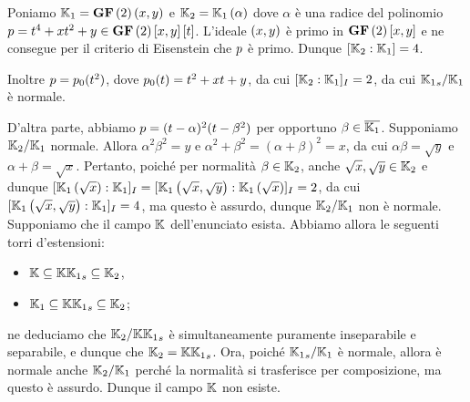 \Solution Poniamo $\mathbb{K}_1 = \textbf{GF} \left ( 2 \right ) \left ( x,y \right )$ e $\mathbb{K}_2 = \mathbb{K}_1 \left ( \alpha \right )$ dove $\alpha$ \`e una radice del polinomio $p = t^4 + xt^2 + y \in \textbf{GF} \left ( 2 \right ) \left [ x,y \right ] \left [ t \right ]$. L'ideale $\left ( x,y \right )$ \`e primo in $\textbf{GF} \left ( 2 \right ) \left [ x,y \right ]$ e ne consegue per il criterio di Eisenstein che $p$ \`e primo. Dunque $[\mathbb{K}_2:\mathbb{K}_1] = 4$.
\par Inoltre $p = p_0(t^2)$, dove $p_0(t) = t^2 + xt + y$, da cui $[\mathbb{K}_2:\mathbb{K}_1]_I = 2$, da cui $\FieldExtension{\SeparableClosure{\Field_1}}{\Field_1}$ \`e normale.
\par D'altra parte, abbiamo $p = (t - \alpha)^2(t - \beta^2)$ per opportuno $\beta \in \overline{\mathbb{K}_1}$. Supponiamo $\mathbb{K}_2/\mathbb{K}_1$ normale. Allora $\alpha^2\beta^2 = y$ e $\alpha^2 + \beta^2 = (\alpha + \beta)^2 = x$, da cui $\alpha\beta = \sqrt{y}$ e $\alpha + \beta = \sqrt{x}$. Pertanto, poich\'e per normalit\`a $\beta \in \mathbb{K}_2$, anche $\sqrt{x}, \sqrt{y} \in \mathbb{K}_2$ e dunque $[\mathbb{K}_1 \left ( \sqrt{x} \right ):\mathbb{K}_1]_I = [\mathbb{K}_1 \left ( \sqrt{x},\sqrt{y} \right ):\mathbb{K}_1 \left ( \sqrt{x} \right )]_I = 2$, da cui $[\mathbb{K}_1 \left ( \sqrt{x},\sqrt{y} \right ):\mathbb{K}_1]_I = 4$, ma questo \`e assurdo, dunque $\mathbb{K}_2/\mathbb{K}_1$ non \`e normale. \EndProof
\\\Solution Supponiamo che il campo $\mathbb{K}$ dell'enunciato esista. Abbiamo allora le seguenti torri d'estensioni:
\begin{itemize}
	\item $\Field \subseteq \FieldComposition{\Field}{\SeparableClosure{\Field_1}} \subseteq \Field_2$,
	\item $\Field_1 \subseteq \FieldComposition{\Field}{\SeparableClosure{\Field_1}} \subseteq \Field_2$;
\end{itemize}
ne deduciamo che $\FieldExtension{\Field_2}{\FieldComposition{\Field}{\SeparableClosure{\Field_1}}}$ \`e simultaneamente puramente inseparabile e separabile, e dunque che $\Field_2 = \FieldComposition{\Field}{\SeparableClosure{\Field_1}}$. Ora, poich\'e $\FieldExtension{\SeparableClosure{\Field_1}}{\Field_1}$ \`e normale, allora \`e normale anche $\mathbb{K}_2/\mathbb{K}_1$ perch\'e la normalit\`a si trasferisce per composizione, ma questo \`e assurdo. Dunque il campo $\mathbb{K}$ non esiste. \EndSolution
